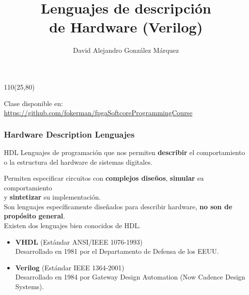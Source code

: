 \documentclass[aspectratio=169]{beamer}
\title{\Huge Lenguajes de descripción\\ de Hardware (Verilog)}
\author{David Alejandro González Márquez}
\date{}
\begin{document}
\begin{frame}[plain]
    \titlepage
    \begin{textblock}{110}(25,80)
    \begin{tcolorbox}[size=small,width=\textwidth,colback={gray!30},title={}]
    \begin{center}
     \scriptsize Clase disponible en: \url{https://github.com/fokerman/fpgaSoftcoreProgrammingCourse}
    \end{center}
    \end{tcolorbox}
    \end{textblock}
\end{frame}

\begin{frame}[fragile,t]
    \frametitle{Hardware Description Lenguajes}
    \begin{block}{HDL}
    Lenguajes de programación que nos permiten \textbf{describir} el comportamiento o la estructura del hardware de sistemas digitales.
    \end{block}
    \pause
    Permiten especificar circuitos con \textbf{complejos diseños}, \textbf{simular} su comportamiento\\
    y \textbf{sintetizar} su implementación.\\
    \bigskip
    \pause
    Son lenguajes específicamente diseñados para describir hardware, \textbf{no son de propósito general}.\\
    \bigskip
    \pause
    Existen dos lenguajes bien conocidos de HDL.
    \begin{itemize}
     \item \textbf{VHDL} (Estándar ANSI/IEEE 1076-1993)\\
     \textcolor{verdeuca}{Desarrollado en 1981 por el Departamento de Defensa de los EEUU.}
     \item \textbf{Verilog} (Estándar IEEE 1364-2001)\\
     \textcolor{verdeuca}{Desarrollado en 1984 por Gateway Design Automation {\small(Now Cadence Design Systems)}.}
    \end{itemize}
\end{frame}
\end{document}
